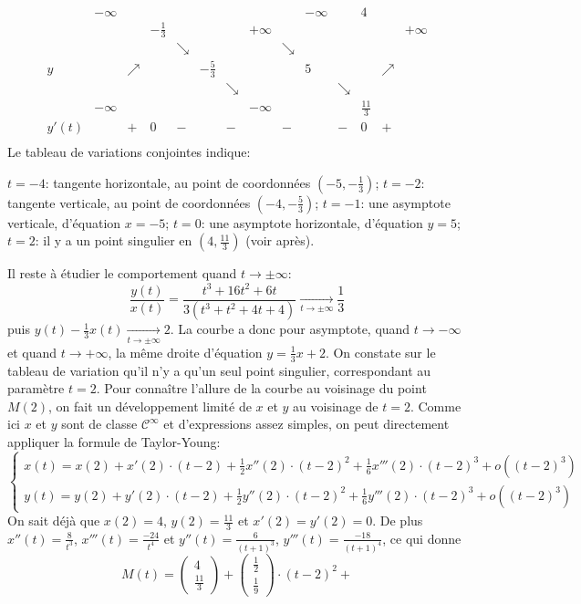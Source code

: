 {\begin{enumerate}
{$$\begin{array}{c|lcccccccccccr}
\ &-\infty &\ & &&&&&&-\infty&&4&&\\\hline
\ & &\ & -\frac{1}{3}&&&&+\infty&&&&&&+\infty\\
\ & &\ & &\searrow&&&&\searrow&&&&&\\
y&\ &\nearrow & &&-\frac{5}{3}&&&&5&&&\nearrow&\\
\ & &\ & &&&\searrow&&&&\searrow&&&\\
\ &-\infty & & &&&&-\infty&&&&\frac{11}{3}&&\\\hline
y'(t)&& + &0 &-&&-&&-&&-&0&+&\\
\end{array}$$
Le tableau de variations conjointes indique:
\begin{itemize}
$t=-4$: tangente horizontale, au point de coordonnées $(-5,-\frac{1}{3})$;
$t=-2$: tangente verticale, au point de coordonnées $(-4,-\frac{5}{3})$;
$t=-1$: une asymptote verticale, d'équation $x=-5$;
$t=0$: une asymptote horizontale, d'équation $y=5$;
$t=2$: il y a un point singulier en $(4,\frac{11}{3})$ (voir après).
\end{itemize}
Il reste à étudier le comportement quand $t\to\pm\infty$:
$$\frac{y(t)}{x(t)}=\frac{t^3+16t^2+6t}{3(t^3+t^2+4t+4)}\xrightarrow[t\to\pm\infty]{}\frac{1}{3}$$
puis $y(t)-\frac{1}{3}x(t)\xrightarrow[t\to\pm\infty]{}2$. La courbe a donc pour asymptote, quand $t\to-\infty$ et quand $t\to+\infty$, la m\^eme droite d'équation $y=\frac{1}{3}x+2$.
On constate sur le tableau de variation qu'il n'y a qu'un seul point singulier, correspondant au paramètre $t=2$. Pour conna\^itre l'allure de la courbe au voisinage du point $M(2)$, on fait un développement limité de $x$ et $y$ au voisinage de $t=2$. Comme ici $x$ et $y$ sont de classe $\mathcal{C}^\infty$ et d'expressions assez simples, on peut directement appliquer la formule de Taylor-Young:
$$\left\{\begin{array}{l}
x(t)=x(2)+x'(2)\cdot(t-2)+\frac{1}{2}x''(2)\cdot(t-2)^2+\frac{1}{6}x'''(2)\cdot(t-2)^3+o((t-2)^3)\\
y(t)=y(2)+y'(2)\cdot(t-2)+\frac{1}{2}y''(2)\cdot(t-2)^2+\frac{1}{6}y'''(2)\cdot(t-2)^3+o((t-2)^3)
\end{array}\right.$$ 
On sait déjà que $x(2)=4$, $y(2)=\frac{11}{3}$ et $x'(2)=y'(2)=0$. De plus
$x''(t)=\frac{8}{t^3}$, $x'''(t)=\frac{-24}{t^4}$ et $y''(t)=\frac{6}{(t+1)^3}$, $y'''(t)=\frac{-18}{(t+1)^4}$, ce qui donne
$$M(t)=\begin{pmatrix}4 \\ \frac{11}{3}\end{pmatrix}+
\begin{pmatrix}\frac{1}{2}\\\frac{1}{9}\end{pmatrix}\cdot (t-2)^2+
$$}
\end{enumerate}}
